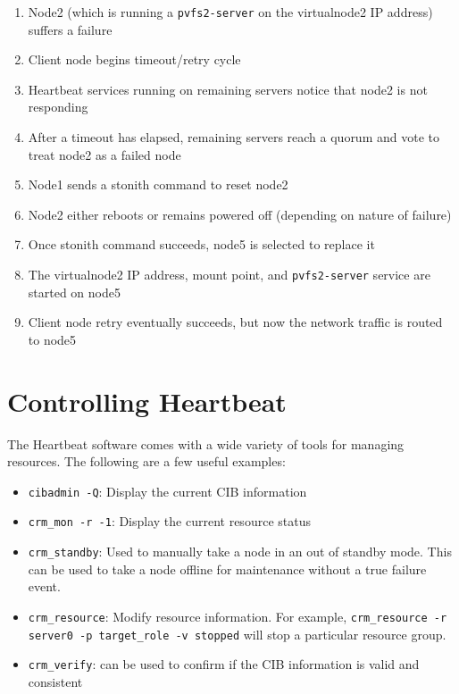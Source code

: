\documentclass[11pt]{article}
\begin{document}
\begin{enumerate}
\item Node2 (which is running a \texttt{pvfs2-server} on the virtualnode2 IP
address) suffers a failure
\item Client node begins timeout/retry cycle
\item Heartbeat services running on remaining servers notice that node2
is not responding
\item After a timeout has elapsed, remaining servers reach a quorum and
vote to treat node2 as a failed node
\item Node1 sends a stonith command to reset node2
\item Node2 either reboots or remains powered off (depending on nature
of failure)
\item Once stonith command succeeds, node5 is selected to replace it
\item The virtualnode2 IP address, mount point, and
\texttt{pvfs2-server} service
are started on node5
\item Client node retry eventually succeeds, but now the network
traffic is routed to node5
\end{enumerate}

\section{Controlling Heartbeat}

The Heartbeat software comes with a wide variety of tools for managing
resources.  The following are a few useful examples:
\begin{itemize}
\item \texttt{cibadmin -Q}: Display the current CIB information
\item \texttt{crm\_mon -r -1}: Display the current resource status
\item \texttt{crm\_standby}: Used to manually take a node in an out of
standby mode.  This can be used to take a node offline for maintenance
without a true failure event.
\item \texttt{crm\_resource}: Modify resource information.  For example,
\texttt{crm\_resource -r server0 -p target\_role -v stopped} will stop a
particular resource group.
\item \texttt{crm\_verify}: can be used to confirm if the CIB
information is valid and consistent
\end{itemize}
\end{document}
